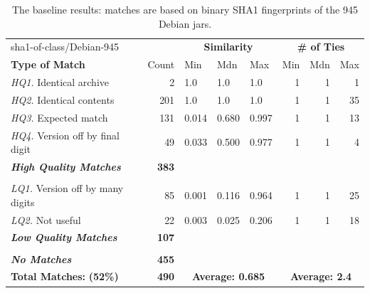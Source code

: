 \begin{table}[h]
    \centering
    \begin{tabular}[htbp]{l|r|lll|rrr}
        sha1-of-class/Debian-945   &              & \multicolumn{3}{c|}{\textbf{Similarity}}  & \multicolumn{3}{c}{\textbf{\# of Ties}} \\
        \textbf{Type of Match}     & Count        & Min   & Mdn    & Max   & Min  & Mdn  & Max  \\
        \hline
        \emph{HQ1.} Identical archive          &   2          & 1.0   & 1.0    & 1.0   & 1    & 1    &  1   \\
        \emph{HQ2.} Identical contents         & 201          & 1.0   & 1.0    & 1.0   & 1    & 1    & 35   \\
        \emph{HQ3.} Expected match             & 131          & 0.014 & 0.680  & 0.997 & 1    & 1    & 13   \\
        \emph{HQ4.} Version off by final digit &  49          & 0.033 & 0.500  & 0.977 & 1    & 1    &  4   \\
        \emph{\textbf{High Quality Matches}}   & \textbf{383} &       &        &       &      &      &      \\
        & & & & & & & \\
        \emph{LQ1.} Version off by many digits &  85          & 0.001 & 0.116  & 0.964 & 1    & 1    & 25   \\
        \emph{LQ2.} Not useful                 &  22          & 0.003 & 0.025  & 0.206 & 1    & 1    & 18   \\
        \emph{\textbf{Low Quality Matches}}    & \textbf{107} &       &        &       &      &      &      \\
        & & & & & & & \\
        \emph{\textbf{No Matches}}             & \textbf{455} &       &        &       &      &      &     \\
        \hline
        \textbf{Total Matches:} \hspace{3em} \textbf{(52\%)} & \textbf{490}   & \multicolumn{3}{c|}{\textbf{Average: 0.685}}  & \multicolumn{3}{c}{\textbf{Average: 2.4}} \\
    \end{tabular}
    \caption{The baseline results:  matches are based on binary SHA1 fingerprints of the 945 Debian jars.}
    \label{tab:debianSha1OfClass}
\end{table}



